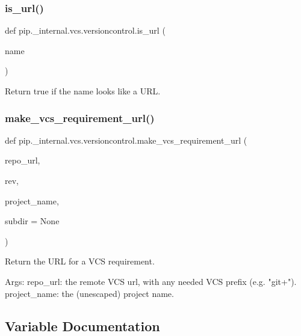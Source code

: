 \subsubsection{\texorpdfstring{is\+\_\+url()}{is\_url()}}
{\footnotesize\ttfamily def pip.\+\_\+internal.\+vcs.\+versioncontrol.\+is\+\_\+url (\begin{DoxyParamCaption}\item[{}]{name }\end{DoxyParamCaption})}

\begin{DoxyVerb}Return true if the name looks like a URL.
\end{DoxyVerb}
 \mbox{\label{namespacepip_1_1__internal_1_1vcs_1_1versioncontrol_a265172f9a4e7f3bcb35d2a8a001e8805}} 
\subsubsection{\texorpdfstring{make\+\_\+vcs\+\_\+requirement\+\_\+url()}{make\_vcs\_requirement\_url()}}
{\footnotesize\ttfamily def pip.\+\_\+internal.\+vcs.\+versioncontrol.\+make\+\_\+vcs\+\_\+requirement\+\_\+url (\begin{DoxyParamCaption}\item[{}]{repo\+\_\+url,  }\item[{}]{rev,  }\item[{}]{project\+\_\+name,  }\item[{}]{subdir = {\ttfamily None} }\end{DoxyParamCaption})}

\begin{DoxyVerb}Return the URL for a VCS requirement.

Args:
  repo_url: the remote VCS url, with any needed VCS prefix (e.g. "git+").
  project_name: the (unescaped) project name.
\end{DoxyVerb}
 

\subsection{Variable Documentation}
\mbox{\label{namespacepip_1_1__internal_1_1vcs_1_1versioncontrol_abd1a73ed07725a5cd6bd41f2e288be76}} 
